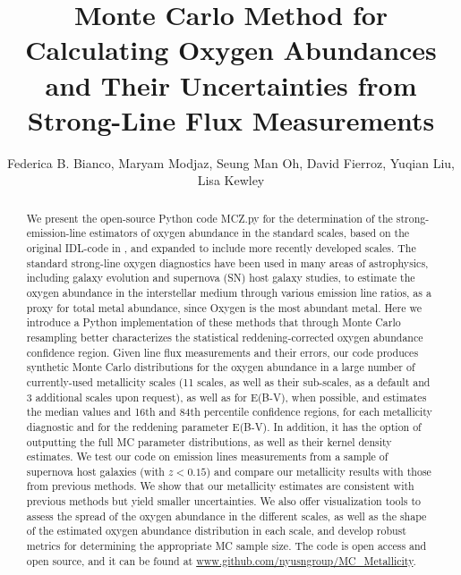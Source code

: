 \documentclass{emulateapj}
\begin{document}
\title{Monte Carlo Method for Calculating Oxygen Abundances and Their Uncertainties from Strong-Line Flux Measurements}

\author{Federica B. Bianco, Maryam Modjaz, Seung Man Oh, David Fierroz, Yuqian Liu, Lisa Kewley}
 
 
\begin{abstract}
We present the open-source Python code MCZ.py for the determination of the strong-emission-line estimators of oxygen abundance in the standard scales, based on the original IDL-code in \citet{kewley02}, and expanded to include more recently developed scales. The standard strong-line oxygen diagnostics have been used in many areas of astrophysics, including galaxy evolution and supernova (SN) host galaxy studies, to estimate the oxygen abundance in the interstellar medium through various emission line ratios, as a proxy for total metal abundance, since Oxygen is the most abundant metal. Here we introduce a Python implementation of these methods that through Monte Carlo resampling  better characterizes the statistical reddening-corrected oxygen abundance confidence region.  Given line flux measurements and their errors, our code produces synthetic Monte Carlo distributions for the oxygen abundance in a large number of currently-used metallicity scales (11 scales, as well as their sub-scales, as a default and 3 additional scales upon request), as well as for E(B-V), when possible, and estimates the median values and 16th and 84th percentile confidence regions, for each metallicity diagnostic and for the reddening parameter E(B-V). In addition, it has the option of outputting the full MC parameter distributions, as well as their kernel density estimates. We test our code on emission lines measurements from a sample of supernova host galaxies (with $z<0.15$) and compare our metallicity results with those from previous methods. We show that our metallicity estimates are consistent with previous methods but yield smaller uncertainties. We also offer visualization tools to assess the spread of the oxygen abundance in the different scales, as well as the shape of the estimated oxygen abundance distribution in each scale, and develop robust metrics for determining the appropriate MC sample size. 
The code is open access and open source, 
and it can be found at \url{www.github.com/nyusngroup/MC_Metallicity}.
\end{abstract}
 
\end{document}
